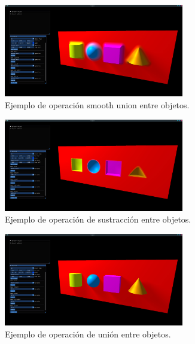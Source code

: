 \begin{figure}[H]
	\centering
	\includegraphics[width=0.7\textwidth]{imagenes/smooth_union.jpg}
	\caption{Ejemplo de operación smooth union entre objetos.}
\end{figure}

\begin{figure}[H]
	\centering
	\includegraphics[width=0.7\textwidth]{imagenes/substract.jpg}
	\caption{Ejemplo de operación de sustracción entre objetos.}
\end{figure}

\begin{figure}[H]
	\centering
	\includegraphics[width=0.7\textwidth]{imagenes/union.jpg}
	\caption{Ejemplo de operación de unión entre objetos.}
\end{figure}